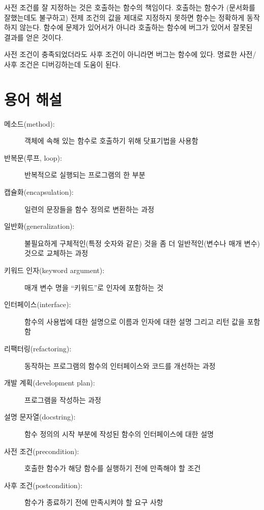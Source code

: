 \documentclass[10pt]{book}
\begin{document}
사전 조건를 잘 지정하는 것은 호출하는 함수의 책임이다.  호출하는 함수가
(문서화를 잘했는데도 불구하고) 전제 조건의 값을 제대로 지정하지 못하면
함수는 정확하게 동작하지 않는다.  함수에 문제가 있어서가 아니라
호출하는 함수에 버그가 있어서 잘못된 결과를 얻은 것이다.

사전 조건이 충족되었더라도 사후 조건이 아니라면 버그는 함수에 있다.
명료한 사전/사후 조건은 디버깅하는데 도움이 된다.



\section{용어 해설}

\begin{description}

\item[메소드(method):] 객체에 속해 있는 함수로 호출하기 위해 닷표기법을
  사용함

\item[반복문(루프, loop):] 반복적으로 실행되는 프로그램의 한 부분

\item[캡슐화(encapsulation):] 일련의 문장들을 함수 정의로 변환하는 과정

\item[일반화(generalization):] 불필요하게 구체적인(특정 숫자와 같은)
  것을 좀 더 일반적인(변수나 매개 변수) 것으로 교체하는 과정

\item[키워드 인자(keyword argument):] 매개 변수 명을 ``키워드''로
  인자에 포함하는 것

\item[인터페이스(interface):] 함수의 사용법에 대한 설명으로 이름과
  인자에 대한 설명 그리고 리턴 값을 포함함

\item[리팩터링(refactoring):] 동작하는 프로그램의 함수의 인터페이스와
  코드를 개선하는 과정

\item[개발 계획(development plan):] 프로그램을 작성하는 과정

\item[설명 문자열(docstring):] 함수 정의의 시작 부분에 작성된 함수의
  인터페이스에 대한 설명

\item[사전 조건(precondition):] 호출한 함수가 해당 함수를 실행하기 전에
  만족해야 할 조건

\item[사후 조건(postcondition):] 함수가 종료하기 전에 만족시켜야 할 요구 사항

\end{description}
\end{document}
